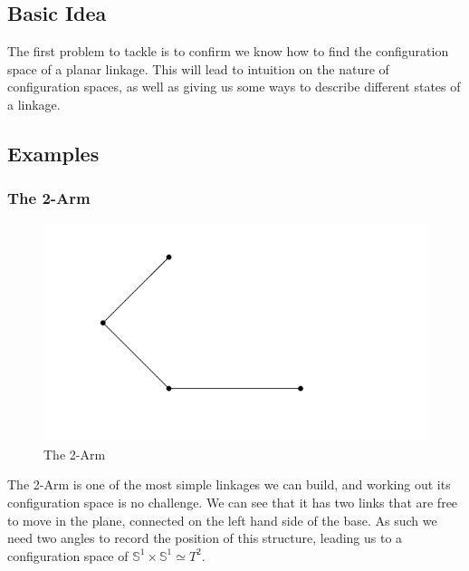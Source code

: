 \documentclass{article}
\begin{document}
\subsection{Basic Idea}

The first problem to tackle is to confirm we know how to find the configuration space of a planar linkage. This will lead to intuition on the nature of configuration spaces, as well as giving us some ways to describe different states of a linkage.

\subsection{Examples}

\subsubsection{The 2-Arm}

\begin{figure}[h!]
\centering
\includegraphics[scale=0.5]{./images/2-arm}
\caption{The 2-Arm}
\label{fig:The 2-Arm}
\end{figure}

\noindent The 2-Arm is one of the most simple linkages we can build, and working out its configuration space is no challenge. We can see that it has two links that are free to move in the plane, connected on the left hand side of the base. As such we need two angles to record the position of this structure, leading us to a configuration space of $\mathbb S^1 \times \mathbb S^1 \simeq T^2$.
\end{document}
